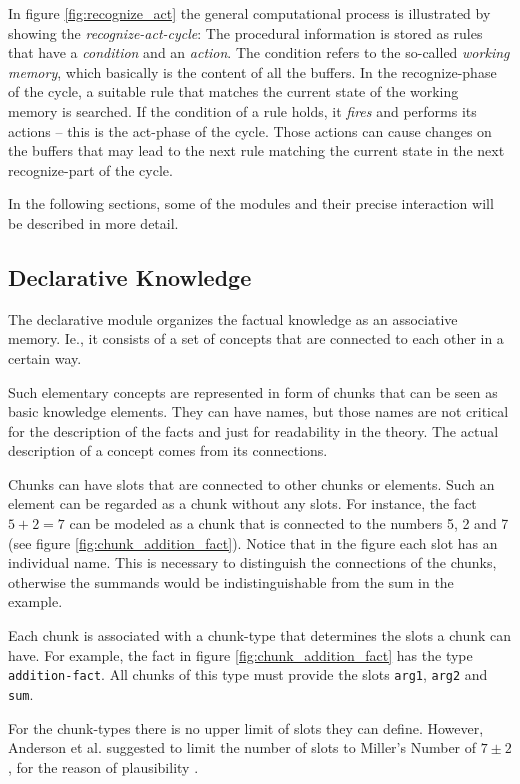 In figure \ref{fig:recognize_act} the general computational process is illustrated by showing the \emph{recognize-act-cycle}: The procedural information is stored as rules that have a \emph{condition} and an \emph{action}. The condition refers to the so-called \emph{working memory}, which basically is the content of all the buffers. In the recognize-phase of the cycle, a suitable rule that matches the current state of the working memory is searched. If the condition of a rule holds, it \emph{fires} and performs its actions -- this is the act-phase of the cycle. Those actions can cause changes on the buffers that may lead to the next rule matching the current state in the next recognize-part of the cycle.

In the following sections, some of the modules and their precise interaction will be described in more detail.

\subsection{Declarative Knowledge}

The declarative module organizes the factual knowledge as an associative memory. Ie., it consists of a set of concepts that are connected to each other in a certain way.

Such elementary concepts are represented in form of chunks that can be seen as basic knowledge elements. They can have names, but those names are not critical for the description of the facts and just for readability in the theory. The actual description of a concept comes from its connections.

Chunks can have slots that are connected to other chunks or elements. Such an element can be regarded as a chunk without any slots. For instance, the fact $5 + 2 = 7$ can be modeled as a chunk that is connected to the numbers 5, 2 and 7 (see figure \ref{fig:chunk_addition_fact}). Notice that in the figure each slot has an individual name. This is necessary to distinguish the connections of the chunks, otherwise the summands would be indistinguishable from the sum in the example.

Each chunk is associated with a chunk-type that determines the slots a chunk can have. For example, the fact in figure \ref{fig:chunk_addition_fact} has the type \verb|addition-fact|. All chunks of this type must provide the slots \verb|arg1|, \verb|arg2| and \verb|sum|.

\label{millers_number}
For the chunk-types there is no upper limit of slots they can define. However, Anderson et al. suggested to limit the number of slots to Miller's Number of $7 \pm 2$, for the reason of plausibility \cite{unknown}. 



